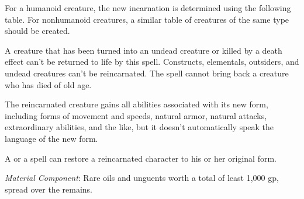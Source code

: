 {	For a humanoid creature, the new incarnation is determined using the following table. For nonhumanoid creatures, a similar table of creatures of the same type should be created.

	A creature that has been turned into an undead creature or killed by a death effect can't be returned to life by this spell.  Constructs, elementals, outsiders, and undead creatures can't be reincarnated. The spell cannot bring back a creature who has died of old age.


	The reincarnated creature gains all abilities associated with its new form, including forms of movement and speeds, natural armor, natural attacks, extraordinary abilities, and the like, but it doesn't automatically speak the language of the new form.

	A  or a  spell can restore a reincarnated character to his or her original form.

	\textit{Material Component}:
	Rare oils and unguents worth a total of least 1,000 gp, spread over the remains.

}
